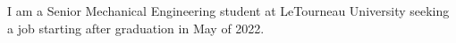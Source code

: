 I am a Senior Mechanical Engineering student at LeTourneau University seeking a job starting after graduation in May of 2022.
